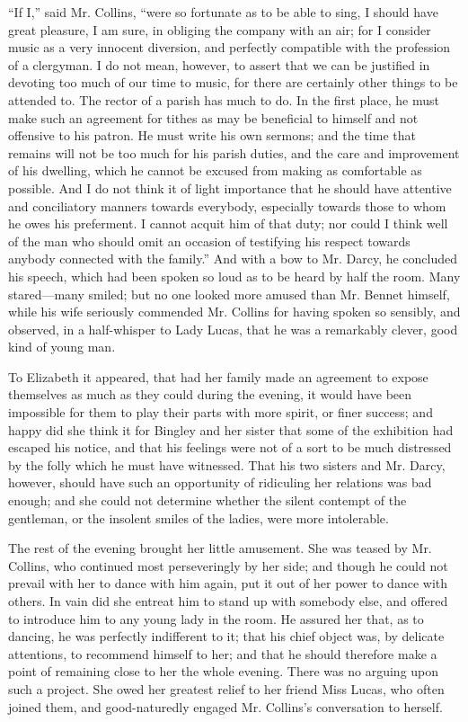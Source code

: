 ``If I,'' said Mr. Collins, ``were so fortunate as to be able to sing, I should have great pleasure, I am sure, in obliging the company with an air; for I consider music as a very innocent diversion, and perfectly compatible with the profession of a clergyman. I do not mean, however, to assert that we can be justified in devoting too much of our time to music, for there are certainly other things to be attended to. The rector of a parish has much to do. In the first place, he must make such an agreement for tithes as may be beneficial to himself and not offensive to his patron. He must write his own sermons; and the time that remains will not be too much for his parish duties, and the care and improvement of his dwelling, which he cannot be excused from making as comfortable as possible. And I do not think it of light importance that he should have attentive and conciliatory manners towards everybody, especially towards those to whom he owes his preferment. I cannot acquit him of that duty; nor could I think well of the man who should omit an occasion of testifying his respect towards anybody connected with the family.'' And with a bow to Mr. Darcy, he concluded his speech, which had been spoken so loud as to be heard by half the room. Many stared---many smiled; but no one looked more amused than Mr. Bennet himself, while his wife seriously commended Mr. Collins for having spoken so sensibly, and observed, in a half-whisper to Lady Lucas, that he was a remarkably clever, good kind of young man.

To Elizabeth it appeared, that had her family made an agreement to expose themselves as much as they could during the evening, it would have been impossible for them to play their parts with more spirit, or finer success; and happy did she think it for Bingley and her sister that some of the exhibition had escaped his notice, and that his feelings were not of a sort to be much distressed by the folly which he must have witnessed. That his two sisters and Mr. Darcy, however, should have such an opportunity of ridiculing her relations was bad enough; and she could not determine whether the silent contempt of the gentleman, or the insolent smiles of the ladies, were more intolerable.

The rest of the evening brought her little amusement. She was teased by Mr. Collins, who continued most perseveringly by her side; and though he could not prevail with her to dance with him again, put it out of her power to dance with others. In vain did she entreat him to stand up with somebody else, and offered to introduce him to any young lady in the room. He assured her that, as to dancing, he was perfectly indifferent to it; that his chief object was, by delicate attentions, to recommend himself to her; and that he should therefore make a point of remaining close to her the whole evening. There was no arguing upon such a project. She owed her greatest relief to her friend Miss Lucas, who often joined them, and good-naturedly engaged Mr. Collins's conversation to herself.

